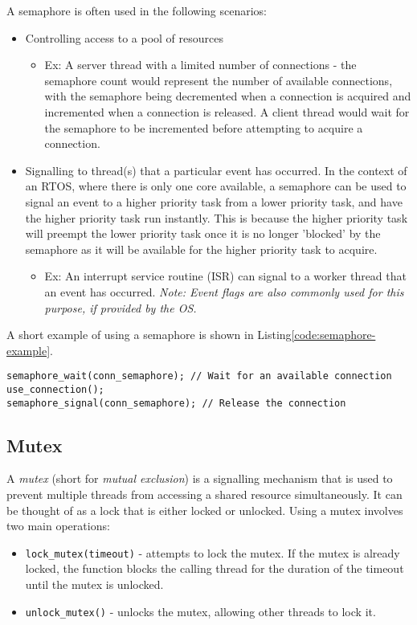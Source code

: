 \documentclass[main.tex]{subfiles}
\begin{document}
\noindent A semaphore is often used in the following scenarios:
\begin{itemize}
    \item Controlling access to a pool of resources 
    \begin{itemize}
        \item Ex: A server thread with a limited number of connections - the semaphore count would represent the number of available connections, with the semaphore being decremented when a connection is acquired and incremented when a connection is released. A client thread would wait for the semaphore to be incremented before attempting to acquire a connection.
    \end{itemize}
    \item Signalling to thread(s) that a particular event has occurred. In the context of an RTOS, where there is only one core available, a semaphore can be used to signal an event to a higher priority task from a lower priority task, and have the higher priority task run instantly. This is because the higher priority task will preempt the lower priority task once it is no longer 'blocked' by the semaphore as it will be available for the higher priority task to acquire.
    \begin {itemize}
        \item Ex: An interrupt service routine (ISR) can signal to a worker thread that an event has occurred. \textit{Note: Event flags are also commonly used for this purpose, if provided by the OS.}
    \end{itemize}
\end{itemize}
A short example of using a semaphore is shown in Listing\ref{code:semaphore-example}.
\begin{lstlisting}[caption={Example of Semaphore Usage}, label={code:semaphore-example}]
semaphore_wait(conn_semaphore); // Wait for an available connection
use_connection();
semaphore_signal(conn_semaphore); // Release the connection
\end{lstlisting}    

\subsection{Mutex}
A \textit{mutex} (short for \textit{mutual exclusion}) is a signalling mechanism that is used to prevent multiple threads from accessing a shared resource simultaneously. It can be thought of as a lock that is either locked or unlocked.
\newline
\newline
\noindent Using a mutex involves two main operations: \begin{itemize}
    \item \texttt{lock\_mutex(timeout)} - attempts to lock the mutex. If the mutex is already locked, the function blocks the calling thread for the duration of the timeout until the mutex is unlocked.
    \item \texttt{unlock\_mutex()} - unlocks the mutex, allowing other threads to lock it.
\end{itemize}
\end{document}
